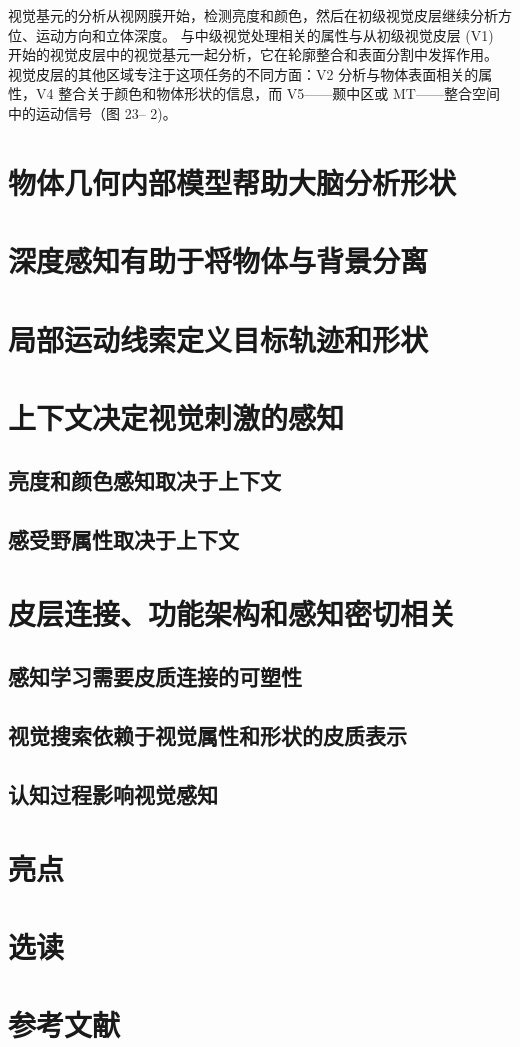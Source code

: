 视觉基元的分析从视网膜开始，检测亮度和颜色，然后在初级视觉皮层继续分析方位、运动方向和立体深度。 与中级视觉处理相关的属性与从初级视觉皮层 (V1) 开始的视觉皮层中的视觉基元一起分析，它在轮廓整合和表面分割中发挥作用。 视觉皮层的其他区域专注于这项任务的不同方面：V2 分析与物体表面相关的属性，V4 整合关于颜色和物体形状的信息，而 V5——颞中区或 MT——整合空间中的运动信号（图 23– 2)。

\section{物体几何内部模型帮助大脑分析形状}

\section{深度感知有助于将物体与背景分离}

\section{局部运动线索定义目标轨迹和形状}

\section{上下文决定视觉刺激的感知}
\subsection{亮度和颜色感知取决于上下文}
\subsection{感受野属性取决于上下文}

\section{皮层连接、功能架构和感知密切相关}
\subsection{感知学习需要皮质连接的可塑性}
\subsection{视觉搜索依赖于视觉属性和形状的皮质表示}
\subsection{认知过程影响视觉感知}

\section{亮点}
\section{选读}
\section{参考文献}